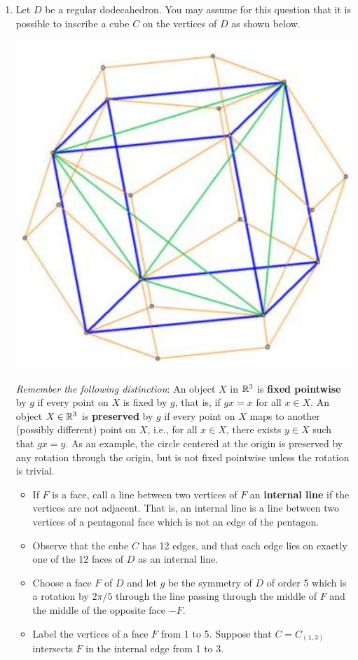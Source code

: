 \documentclass[../psets.tex]{subfiles}
\begin{document}
\begin{enumerate}
\begin{proof}
        as desired.
    \end{proof}
    \item Let $D$ be a regular dodecahedron. You may assume for this question that it is possible to inscribe a cube $C$ on the vertices of $D$ as shown below.
    \begin{center}
        \includegraphics[width=0.4\linewidth]{../ExtFiles/dodecahedronCube.png}
    \end{center}
    \emph{Remember the following distinction}: An object $X$ in $\mathbb{R}^3$ is \textbf{fixed pointwise} by $g$ if every point on $X$ is fixed by $g$, that is, if $gx=x$ for all $x\in X$. An object $X\in\mathbb{R}^3$ is \textbf{preserved} by $g$ if every point on $X$ maps to another (possibly different) point on $X$, i.e., for all $x\in X$, there exists $y\in X$ such that $gx=y$. As an example, the circle centered at the origin is preserved by any rotation through the origin, but is not fixed pointwise unless the rotation is trivial.
    \begin{itemize}
        \item If $F$ is a face, call a line between two vertices of $F$ an \textbf{internal line} if the vertices are not adjacent. That is, an internal line is a line between two vertices of a pentagonal face which is not an edge of the pentagon.
        \item Observe that the cube $C$ has 12 edges, and that each edge lies on exactly one of the 12 faces of $D$ as an internal line.
        \item Choose a face $F$ of $D$ and let $g$ be the symmetry of $D$ of order 5 which is a rotation by $2\pi/5$ through the line passing through the middle of $F$ and the middle of the opposite face $-F$.
        \item Label the vertices of a face $F$ from 1 to 5. Suppose that $C=C_{(1,3)}$ intersects $F$ in the internal edge from 1 to 3.
    \end{itemize}
    \begin{enumerate}

\end{enumerate}
\end{enumerate}
\end{document}

